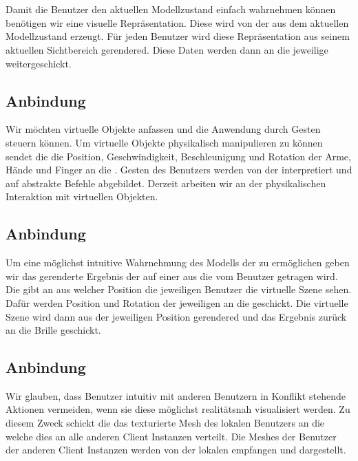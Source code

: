\section{\visualization}
\label{sec:visualization}
Damit die Benutzer den aktuellen Modellzustand einfach wahrnehmen können
benötigen wir eine visuelle Repräsentation. Diese wird von der \visualization
aus dem aktuellen Modellzustand erzeugt. Für jeden Benutzer wird diese
Repräsentation aus seinem aktuellen Sichtbereich gerendered. Diese Daten werden
dann an die jeweilige \mobileDevice weitergeschickt.\\

\subsection{\gestureRecognition Anbindung}

Wir möchten virtuelle Objekte anfassen und die Anwendung durch Gesten steuern
können. Um virtuelle Objekte physikalisch manipulieren zu können sendet die
\constructionLogic die Position, Geschwindigkeit, Beschleunigung und Rotation
der Arme, Hände und Finger an die \constructionLogic. Gesten des Benutzers
werden von der \gestureRecognition interpretiert und auf abstrakte Befehle
abgebildet. Derzeit arbeiten wir an der physikalischen Interaktion mit
virtuellen Objekten.\\ 

\subsection{\mobileDeviceComponent Anbindung}

Um eine möglichst intuitive Wahrnehmung des Modells der \constructionLogic zu
ermöglichen geben wir das gerenderte Ergebnis der \visualization auf einer
\mobileDevice aus die vom Benutzer getragen wird. Die \mobileDeviceComponent
gibt an aus welcher Position die jeweiligen Benutzer die virtuelle Szene sehen.
Dafür werden Position und Rotation der jeweiligen \mobileDevice an die
\visualization geschickt. Die virtuelle Szene wird dann aus der jeweiligen
Position gerendered und das Ergebnis zurück an die Brille geschickt.

\subsection{\userReconstruction Anbindung}

Wir glauben, dass Benutzer intuitiv mit anderen Benutzern in Konflikt stehende
Aktionen vermeiden, wenn sie diese möglichst realitätsnah visualisiert werden.
Zu diesem Zweck schickt die \userReconstruction das texturierte Mesh des lokalen
Benutzers an die \visualization welche dies an alle anderen Client Instanzen
verteilt. Die Meshes der Benutzer der anderen Client Instanzen werden von der
lokalen \visualization empfangen und dargestellt.

